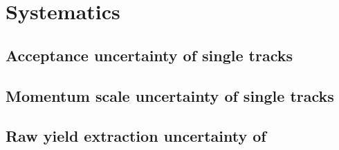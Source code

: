 \section{Systematics}

\subsection{Acceptance uncertainty of single tracks}
\label{sec:systematics_acceptance}


\subsection{Momentum scale uncertainty of single tracks}


\subsection{Raw yield extraction uncertainty of \kstar}

